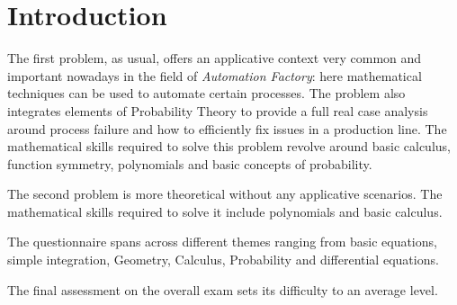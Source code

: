 \section{Introduction}

The first problem, as usual, offers an applicative context very common and important
nowadays in the field of \emph{Automation Factory}: here mathematical techniques
can be used to automate certain processes. The problem also integrates elements of
Probability Theory to provide a full real case analysis around process failure and how
to efficiently fix issues in a production line. The mathematical skills required to solve
this problem revolve around basic calculus, function symmetry, polynomials and
basic concepts of probability.

The second problem is more theoretical without any applicative scenarios. The
mathematical skills required to solve it include polynomials and basic calculus.

The questionnaire spans across different themes ranging from basic equations,
simple integration, Geometry, Calculus, Probability and differential equations.

The final assessment on the overall exam sets its difficulty to an average level.